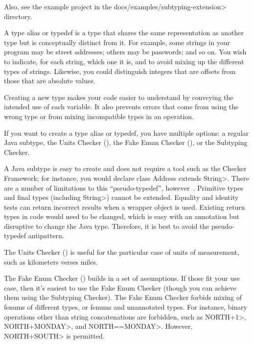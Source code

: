 Also, see the example project in the \<docs/examples/subtyping-extension> directory.



A type alias or typedef is a type that shares the same representation as
another type but is conceptually distinct from it.  For example, some
strings in your program may be street addresses; others may be passwords;
and so on.  You wish to indicate, for each string, which one it is, and to
avoid mixing up the different types of strings.  Likewise, you could
distinguish integers that are offsets from those that are absolute values.

Creating a new type makes your code easier to understand by conveying the
intended use of each variable.  It also prevents errors that come from
using the wrong type or from mixing incompatible types in an operation.

If you want to create a type alias or typedef, you have multiple options:
a regular Java subtype,
the Units Checker (),
the Fake Enum Checker (), or
the Subtyping Checker.

A Java subtype is easy to create and does not require a tool such as the
Checker Framework; for instance, you would declare \<class Address extends
String>.  There are a number of limitations to this ``pseudo-typedef'',
however~\cite{Goetz2006:typedef}.
Primitive types and final types (including \<String>) cannot be extended.
Equality and identity tests can return incorrect results when a wrapper
object is used.  Existing return types in code would need to be changed,
which is easy with an annotation but disruptive to change the Java type.
Therefore, it is best to avoid the pseudo-typedef antipattern.

The Units Checker () is useful for the
particular case of units of measurement, such as kilometers verses miles.

The Fake Enum Checker ()
builds in a set of assumptions.  If those fit your
use case, then it's easiest to use the Fake Enum Checker (though you can
achieve them using the Subtyping Checker).  The Fake Enum Checker forbids
mixing of fenums of different types, or fenums and unannotated types.  For
instance, binary operations other than string concatenations are forbidden,
such as \<NORTH+1>, \<NORTH+MONDAY>, and \<NORTH==MONDAY>.  However,
\<NORTH+SOUTH> is permitted.

